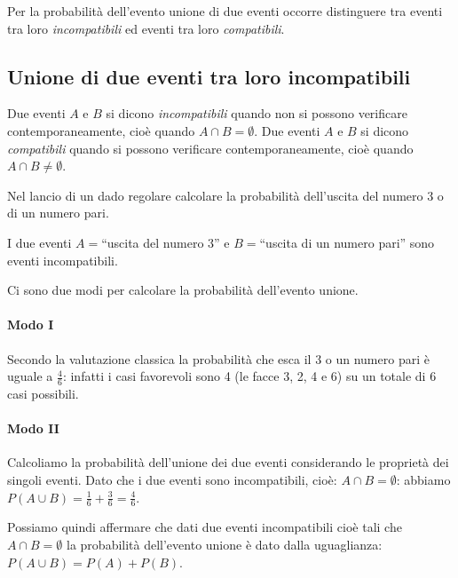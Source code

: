 Per la probabilità dell'evento unione di due eventi occorre distinguere tra eventi tra loro \emph{incompatibili} ed eventi tra loro \emph{compatibili}.

\subsection[Unione di due eventi tra loro incompatibili]{Unione di due eventi tra loro incompatibili}

\begin{definizione}
Due eventi $A$ e $B$ si dicono \emph{incompatibili} quando non si possono verificare contemporaneamente, cioè quando $A\cap B=\emptyset$. Due eventi $A$ e $B$ si dicono \emph{compatibili} quando si possono verificare contemporaneamente, cioè quando $A\cap B\neq \emptyset$.
\end{definizione}

\begin{exrig}
\begin{esempio}
Nel lancio di un dado regolare calcolare la probabilità dell'uscita del numero 3 o di un numero pari.

I due eventi $A=$``uscita del numero 3'' e $B=$``uscita di un numero pari'' sono eventi incompatibili.

Ci sono due modi per calcolare la probabilità dell'evento unione.
\paragraph{Modo I} Secondo la valutazione classica la probabilità che esca il $3$ o un numero pari è uguale a $\frac 4 6$: infatti i casi favorevoli sono 4 (le facce 3, 2, 4 e 6) su un totale di $6$ casi possibili.
\paragraph{Modo II} Calcoliamo la probabilità dell'unione dei due eventi considerando le proprietà dei singoli eventi. Dato che i due eventi sono incompatibili, cioè: $A\cap B=\emptyset $: abbiamo $P(A\cup B)=\frac 1 6+\frac 3 6=\frac 4 6$.
\begin{center}
 
\end{center}
\end{esempio}
\end{exrig}

Possiamo quindi affermare che dati due eventi incompatibili cioè tali che $A\cap B=\emptyset$ la probabilità dell'evento unione è dato dalla uguaglianza: $P(A\cup B)=P(A)+P(B)$.

